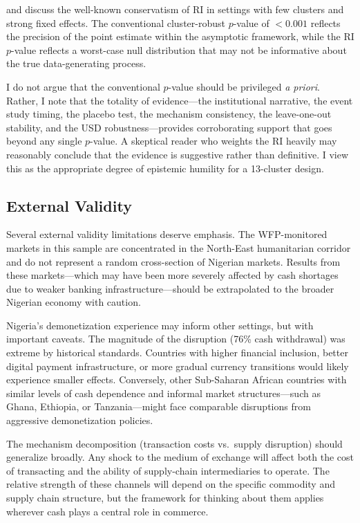 \documentclass[12pt]{article}
\begin{document}
\citet{young2019channeling} and \citet{mackinnon2023cluster} discuss the well-known conservatism of RI in settings with few clusters and strong fixed effects. The conventional cluster-robust $p$-value of $< 0.001$ reflects the precision of the point estimate within the asymptotic framework, while the RI $p$-value reflects a worst-case null distribution that may not be informative about the true data-generating process.

I do not argue that the conventional $p$-value should be privileged \emph{a priori}. Rather, I note that the totality of evidence---the institutional narrative, the event study timing, the placebo test, the mechanism consistency, the leave-one-out stability, and the USD robustness---provides corroborating support that goes beyond any single $p$-value. A skeptical reader who weights the RI heavily may reasonably conclude that the evidence is suggestive rather than definitive. I view this as the appropriate degree of epistemic humility for a 13-cluster design.

\subsection{External Validity}

Several external validity limitations deserve emphasis. The WFP-monitored markets in this sample are concentrated in the North-East humanitarian corridor and do not represent a random cross-section of Nigerian markets. Results from these markets---which may have been more severely affected by cash shortages due to weaker banking infrastructure---should be extrapolated to the broader Nigerian economy with caution.

Nigeria's demonetization experience may inform other settings, but with important caveats. The magnitude of the disruption (76\% cash withdrawal) was extreme by historical standards. Countries with higher financial inclusion, better digital payment infrastructure, or more gradual currency transitions would likely experience smaller effects. Conversely, other Sub-Saharan African countries with similar levels of cash dependence and informal market structures---such as Ghana, Ethiopia, or Tanzania---might face comparable disruptions from aggressive demonetization policies.

The mechanism decomposition (transaction costs vs.\ supply disruption) should generalize broadly. Any shock to the medium of exchange will affect both the cost of transacting and the ability of supply-chain intermediaries to operate. The relative strength of these channels will depend on the specific commodity and supply chain structure, but the framework for thinking about them applies wherever cash plays a central role in commerce.
\end{document}
